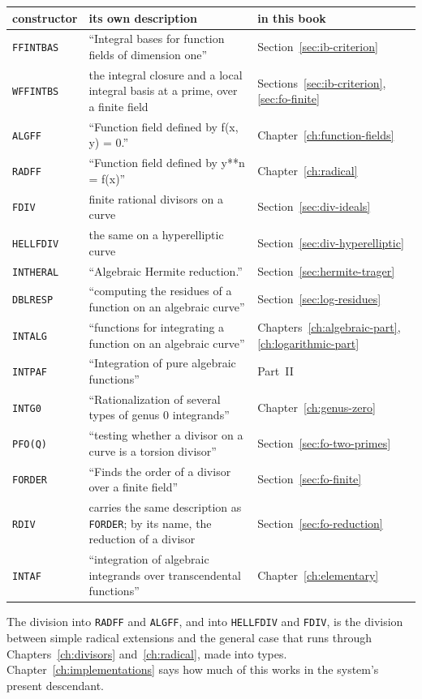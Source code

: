 \begin{center}
\small
\begin{longtable}{@{}l>{\raggedright}p{.44\linewidth}>{\raggedright\arraybackslash}p{.27\linewidth}@{}}
\toprule
constructor & its own description & in this book \\
\midrule
\endhead
\texttt{FFINTBAS} & ``Integral bases for function fields of dimension one'' & Section~\ref{sec:ib-criterion} \\
\texttt{WFFINTBS} & the integral closure and a local integral basis at a prime, over a finite field & Sections~\ref{sec:ib-criterion}, \ref{sec:fo-finite} \\
\texttt{ALGFF} & ``Function field defined by f(x, y) = 0.'' & Chapter~\ref{ch:function-fields} \\
\texttt{RADFF} & ``Function field defined by y**n = f(x)'' & Chapter~\ref{ch:radical} \\
\texttt{FDIV} & finite rational divisors on a curve & Section~\ref{sec:div-ideals} \\
\texttt{HELLFDIV} & the same on a hyperelliptic curve & Section~\ref{sec:div-hyperelliptic} \\
\texttt{INTHERAL} & ``Algebraic Hermite reduction.'' & Section~\ref{sec:hermite-trager} \\
\texttt{DBLRESP} & ``computing the residues of a function on an algebraic curve'' & Section~\ref{sec:log-residues} \\
\texttt{INTALG} & ``functions for integrating a function on an algebraic curve'' & Chapters~\ref{ch:algebraic-part}, \ref{ch:logarithmic-part} \\
\texttt{INTPAF} & ``Integration of pure algebraic functions'' & Part~II \\
\texttt{INTG0} & ``Rationalization of several types of genus 0 integrands'' & Chapter~\ref{ch:genus-zero} \\
\texttt{PFO(Q)} & ``testing whether a divisor on a curve is a torsion divisor'' & Section~\ref{sec:fo-two-primes} \\
\texttt{FORDER} & ``Finds the order of a divisor over a finite field'' & Section~\ref{sec:fo-finite} \\
\texttt{RDIV} & carries the same description as \texttt{FORDER}; by its name, the reduction of a divisor & Section~\ref{sec:fo-reduction} \\
\texttt{INTAF} & ``integration of algebraic integrands over transcendental functions'' & Chapter~\ref{ch:elementary} \\
\bottomrule
\end{longtable}
\end{center}

The division into \texttt{RADFF} and \texttt{ALGFF}, and into
\texttt{HELLFDIV} and \texttt{FDIV}, is the division between simple radical
extensions and the general case that runs through
Chapters~\ref{ch:divisors} and~\ref{ch:radical}, made into types.
Chapter~\ref{ch:implementations} says how much of this works in the system's
present descendant.
